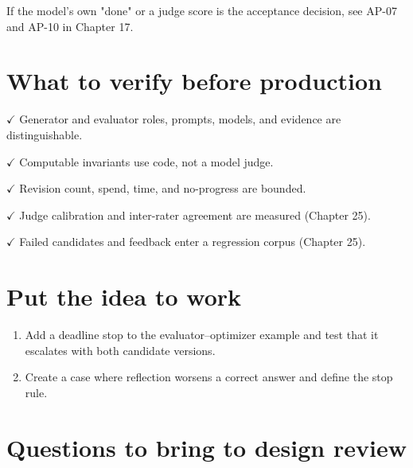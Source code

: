 If the model's own "done" or a judge score is the acceptance decision, see AP-07 and AP-10 in Chapter 17.\par

\section{What to verify before production}

\textbf{\ensuremath{\checkmark}} Generator and evaluator roles, prompts, models, and evidence are distinguishable.\par

\textbf{\ensuremath{\checkmark}} Computable invariants use code, not a model judge.\par

\textbf{\ensuremath{\checkmark}} Revision count, spend, time, and no-progress are bounded.\par

\textbf{\ensuremath{\checkmark}} Judge calibration and inter-rater agreement are measured (Chapter 25).\par

\textbf{\ensuremath{\checkmark}} Failed candidates and feedback enter a regression corpus (Chapter 25).\par

\section{Put the idea to work}

\begin{enumerate}

\item Add a deadline stop to the evaluator–optimizer example and test that it escalates with both candidate versions.

\item Create a case where reflection worsens a correct answer and define the stop rule.

\end{enumerate}

\section{Questions to bring to design review}

